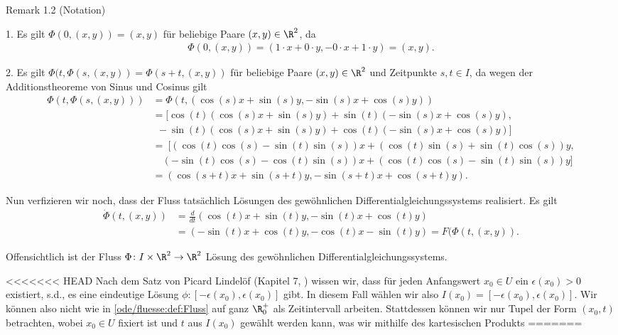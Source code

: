 \documentclass[letterpaper,10pt,english]{jupyterBook}
\begin{document}
\begin{emphBox}{}{}{Remark 1.2 (Notation)}
\begin{example}{}{}
\par
1. Es gilt \(\Phi(0, (x,y)) = (x,y)\) für beliebige Paare \((x,y) \in \R^2\), da
\begin{align*}
\Phi(0, (x,y)) = (1\cdot x + 0\cdot y, - 0 \cdot x + 1 \cdot y) = (x,y).
\end{align*}
\par
2. Es gilt \(\Phi(t, \Phi(s,(x,y)) = \Phi(s + t, (x,y))\) für beliebige Paare \((x,y) \in \R^2\) und Zeitpunkte \(s,t \in I\), da wegen der Additionstheoreme von Sinus und Cosinus gilt
\begin{align*}
\Phi(t, \Phi(s,(x,y))) &= \Phi(t, (\cos(s)x + \sin(s)y, -\sin(s)x + \cos(s)y)) \\
&= [\cos(t)(\cos(s)x + \sin(s)y) + \sin(t)(-\sin(s)x + \cos(s)y), \\
& \ \ -\sin(t)(\cos(s)x + \sin(s)y) + \cos(t)(-\sin(s)x + \cos(s)y)]\\
&= \ [ (\cos(t)\cos(s) - \sin(t)\sin(s))x + (\cos(t)\sin(s) + \sin(t)\cos(s))y, \\
& \quad (-\sin(t)\cos(s) - \cos(t)\sin(s))x + (\cos(t)\cos(s) - \sin(t)\sin(s))y ] \\
&= (\cos(s+t)x + \sin(s+t)y, -\sin(s+t)x + \cos(s+t)y).
\end{align*}
\par
Nun verfizieren wir noch, dass der Fluss tatsächlich Lösungen des gewöhnlichen Differentialgleichungssystems realisiert.
Es gilt
\begin{align*}
\dot{\Phi}(t, (x,y)) &= \frac{d}{dt}(\cos(t)x + \sin(t)y, -\sin(t)x + \cos(t)y) \\
&= (-\sin(t)x + \cos(t)y, -\cos(t)x - \sin(t)y) = F(\Phi(t,(x,y)).
\end{align*}
\par
Offensichtlich ist der Fluss \(\Phi \colon I \times \R^2 \rightarrow \R^2\) Lösung des gewöhnlichen Differentialgleichungssystems.
\end{example}


<<<<<<< HEAD
Nach dem Satz von Picard Lindelöf (Kapitel 7, \cite{Ten21}) wissen wir, dass für jeden Anfangswert \(x_0\in U\) ein \(\epsilon(x_0) >0\) existiert, s.d., es eine eindeutige Lösung \(\phi: [-\epsilon(x_0), \epsilon(x_0)]\) gibt. In diesem Fall wählen wir also \(I(x_0)=[-\epsilon(x_0), \epsilon(x_0)]\). Wir können also nicht wie in \cref{ode/fluesse:def:Fluss} auf ganz \(\R^+_0\) als Zeitintervall arbeiten. Stattdessen können wir nur Tupel der Form \((x_0, t)\) betrachten, wobei \(x_0\in U\) fixiert ist und \(t\) aus \(I(x_0)\) gewählt werden kann, was wir mithilfe des kartesischen Produkts
=======

\end{emphBox}
\end{document}
